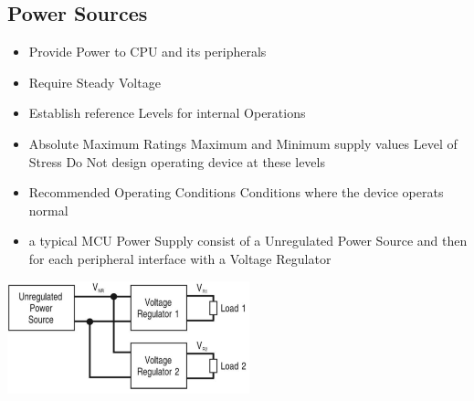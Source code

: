 \subsection{Power Sources }
\begin{minipage}{13cm}
\begin{itemize}
	\item Provide Power to CPU and its peripherals
	\item Require Steady Voltage
	\item Establish reference Levels for internal Operations
	\item Absolute Maximum Ratings
	\subitem Maximum and Minimum supply values
	\subitem Level of Stress
	\subitem Do Not design operating device at these levels
	\item Recommended Operating Conditions
	\subitem Conditions where the device operats normal
	\item a typical MCU Power Supply consist of a Unregulated Power Source and then for each peripheral interface with a Voltage Regulator
\end{itemize}
\end{minipage}
\begin{minipage}{5cm}
    \hspace*{-2cm}
    \includegraphics[width=7cm]{images/PowerSource.png}
\end{minipage}

